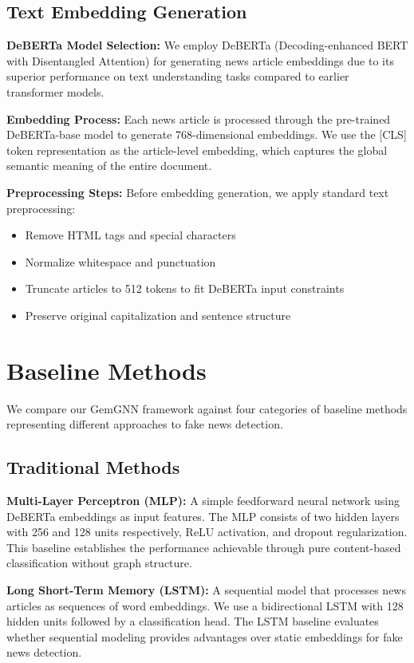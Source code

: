 \subsection{Text Embedding Generation}

\textbf{DeBERTa Model Selection:} We employ DeBERTa (Decoding-enhanced BERT with Disentangled Attention) for generating news article embeddings due to its superior performance on text understanding tasks compared to earlier transformer models.

\textbf{Embedding Process:} Each news article is processed through the pre-trained DeBERTa-base model to generate 768-dimensional embeddings. We use the [CLS] token representation as the article-level embedding, which captures the global semantic meaning of the entire document.

\textbf{Preprocessing Steps:} Before embedding generation, we apply standard text preprocessing:
\begin{itemize}
\item Remove HTML tags and special characters
\item Normalize whitespace and punctuation
\item Truncate articles to 512 tokens to fit DeBERTa input constraints
\item Preserve original capitalization and sentence structure
\end{itemize}

\section{Baseline Methods}

We compare our GemGNN framework against four categories of baseline methods representing different approaches to fake news detection.

\subsection{Traditional Methods}

\textbf{Multi-Layer Perceptron (MLP):} A simple feedforward neural network using DeBERTa embeddings as input features. The MLP consists of two hidden layers with 256 and 128 units respectively, ReLU activation, and dropout regularization. This baseline establishes the performance achievable through pure content-based classification without graph structure.

\textbf{Long Short-Term Memory (LSTM):} A sequential model that processes news articles as sequences of word embeddings. We use a bidirectional LSTM with 128 hidden units followed by a classification head. The LSTM baseline evaluates whether sequential modeling provides advantages over static embeddings for fake news detection.


